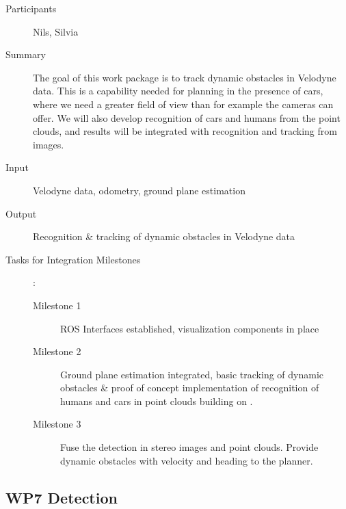 \documentclass[11pt,a4paper]{article}
\begin{document}
\begin{description}
\item[Participants] Nils, Silvia
\item[Summary] The goal of this work package is to track dynamic obstacles in Velodyne data.
			   This is a capability needed for planning in the presence of cars, where we
			   need a greater field of view than for example the cameras can offer.
			   We will also develop recognition of cars and humans from the point clouds,
			   and results will be integrated with recognition and tracking from images.
\item[Input] Velodyne data, odometry, ground plane estimation
\item[Output] Recognition \& tracking of dynamic obstacles in Velodyne data
\item[Tasks for Integration Milestones]:\
	\begin{description}
		\item[Milestone 1] ROS Interfaces established, visualization components in place
		\item[Milestone 2] Ground plane estimation integrated, basic tracking of dynamic obstacles \&
						   proof of concept implementation of recognition of humans and cars in point 
						   clouds building on \cite{wang2015voting}.
		\item[Milestone 3] Fuse the detection in stereo images and point clouds. Provide dynamic obstacles
						   with velocity and heading to the planner.
	\end{description}	 
\end{description}

\subsection{WP7 Detection} %
\end{document}
